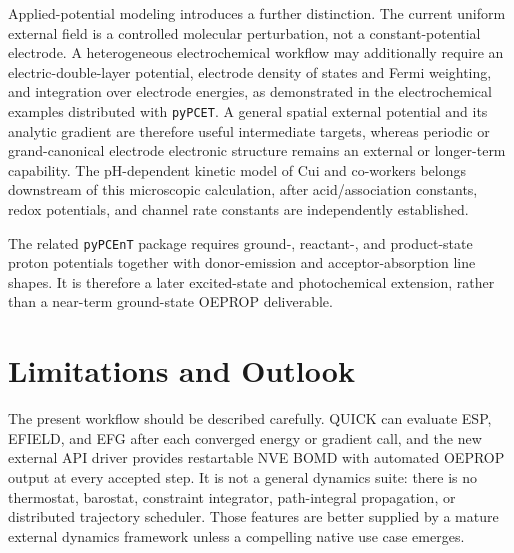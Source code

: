 \documentclass[journal=jctcce,manuscript=article,email=false]{achemso}
\newcommand{\quick}{QUICK}
\begin{document}
Applied-potential modeling introduces a further distinction.  The current
uniform external field is a controlled molecular perturbation, not a
constant-potential electrode.  A heterogeneous electrochemical workflow
may additionally require an electric-double-layer potential, electrode
density of states and Fermi weighting, and integration over electrode
energies, as demonstrated in the electrochemical examples distributed
with \texttt{pyPCET}.  A general spatial external potential and its
analytic gradient are therefore useful intermediate targets, whereas
periodic or grand-canonical electrode electronic structure remains an
external or longer-term capability.  The pH-dependent kinetic model of
Cui and co-workers belongs downstream of this microscopic calculation,
after acid/association constants, redox potentials, and channel rate
constants are independently established.\cite{CuiPHTKinetics2023}

The related \texttt{pyPCEnT} package requires ground-, reactant-, and
product-state proton potentials together with donor-emission and
acceptor-absorption line shapes.\cite{CuiPCEnT2024}  It is therefore a
later excited-state and photochemical extension, rather than a near-term
ground-state OEPROP deliverable.

\section{Limitations and Outlook}

The present workflow should be described carefully.  \quick{} can evaluate
ESP, EFIELD, and EFG after each converged energy or gradient call, and the
new external API driver provides restartable NVE BOMD with automated
OEPROP output at every accepted step.  It is not a general dynamics suite:
there is no thermostat, barostat, constraint integrator, path-integral
propagation, or distributed trajectory scheduler.  Those features are
better supplied by a mature external dynamics framework unless a
compelling native use case emerges.
\end{document}
